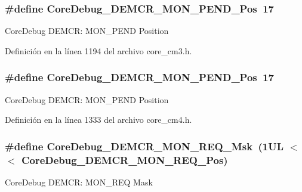 \subsubsection[{\texorpdfstring{Core\+Debug\+\_\+\+D\+E\+M\+C\+R\+\_\+\+M\+O\+N\+\_\+\+P\+E\+N\+D\+\_\+\+Pos}{CoreDebug_DEMCR_MON_PEND_Pos}}]{\setlength{\rightskip}{0pt plus 5cm}\#define Core\+Debug\+\_\+\+D\+E\+M\+C\+R\+\_\+\+M\+O\+N\+\_\+\+P\+E\+N\+D\+\_\+\+Pos~17}\hypertarget{group___c_m_s_i_s___core_debug_ga1e2f706a59e0d8131279af1c7e152f8d}{}\label{group___c_m_s_i_s___core_debug_ga1e2f706a59e0d8131279af1c7e152f8d}
Core\+Debug D\+E\+M\+CR\+: M\+O\+N\+\_\+\+P\+E\+ND Position 

Definición en la línea 1194 del archivo core\+\_\+cm3.\+h.

\subsubsection[{\texorpdfstring{Core\+Debug\+\_\+\+D\+E\+M\+C\+R\+\_\+\+M\+O\+N\+\_\+\+P\+E\+N\+D\+\_\+\+Pos}{CoreDebug_DEMCR_MON_PEND_Pos}}]{\setlength{\rightskip}{0pt plus 5cm}\#define Core\+Debug\+\_\+\+D\+E\+M\+C\+R\+\_\+\+M\+O\+N\+\_\+\+P\+E\+N\+D\+\_\+\+Pos~17}\hypertarget{group___c_m_s_i_s___core_debug_ga1e2f706a59e0d8131279af1c7e152f8d}{}\label{group___c_m_s_i_s___core_debug_ga1e2f706a59e0d8131279af1c7e152f8d}
Core\+Debug D\+E\+M\+CR\+: M\+O\+N\+\_\+\+P\+E\+ND Position 

Definición en la línea 1333 del archivo core\+\_\+cm4.\+h.

\subsubsection[{\texorpdfstring{Core\+Debug\+\_\+\+D\+E\+M\+C\+R\+\_\+\+M\+O\+N\+\_\+\+R\+E\+Q\+\_\+\+Msk}{CoreDebug_DEMCR_MON_REQ_Msk}}]{\setlength{\rightskip}{0pt plus 5cm}\#define Core\+Debug\+\_\+\+D\+E\+M\+C\+R\+\_\+\+M\+O\+N\+\_\+\+R\+E\+Q\+\_\+\+Msk~(1\+U\+L $<$$<$ Core\+Debug\+\_\+\+D\+E\+M\+C\+R\+\_\+\+M\+O\+N\+\_\+\+R\+E\+Q\+\_\+\+Pos)}\hypertarget{group___c_m_s_i_s___core_debug_gae6384cbe8045051186d13ef9cdeace95}{}\label{group___c_m_s_i_s___core_debug_gae6384cbe8045051186d13ef9cdeace95}
Core\+Debug D\+E\+M\+CR\+: M\+O\+N\+\_\+\+R\+EQ Mask 


